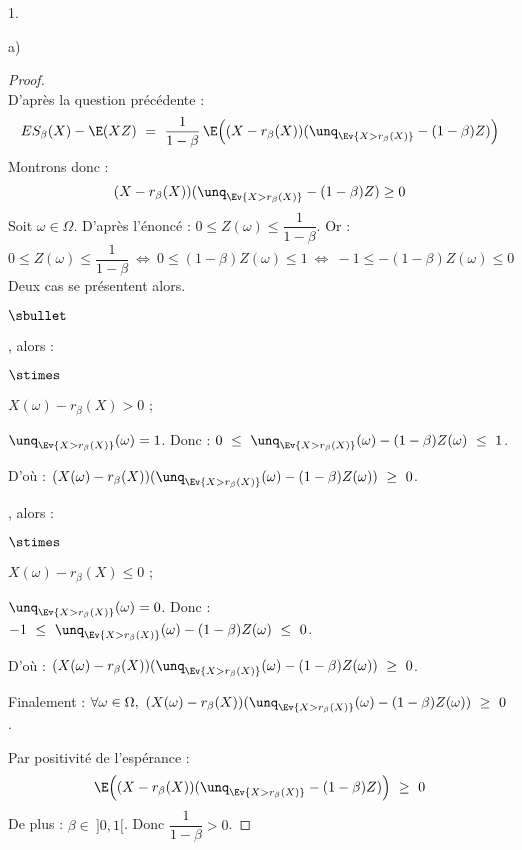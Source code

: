 \documentclass[11pt]{article}%
\begin{document}
\begin{noliste}{1.}
\begin{noliste}{a)}
    \begin{proof}~\\
      D'après la question précédente :
      \[
        ES_\beta(X) - \E(XZ) \ = \ \dfrac{1}{1-\beta} \, 
	\E\Big( (X- r_\beta(X)) (\unq_{\Ev{X > r_\beta(X)}} - 
	(1-\beta) Z )\Big)
      \]
      Montrons donc :
      \[
        (X- r_\beta(X)) (\unq_{\Ev{X > r_\beta(X)}} - 
	(1-\beta) Z ) \geq 0
      \]
      Soit $\omega \in \Omega$. D'après l'énoncé : $0 \leq Z(\omega) 
      \leq \dfrac{1}{1-\beta}$. Or :
      \[
        0 \leq Z(\omega) \leq \dfrac{1}{1-\beta} \ \Leftrightarrow \
        0 \leq (1-\beta)Z(\omega) \leq 1 \ \Leftrightarrow \ 
        -1 \leq -(1-\beta)Z(\omega) \leq 0
      \]
      Deux cas se présentent alors.
      \begin{noliste}{$\sbullet$}
	\item {}, alors :
	\begin{noliste}{$\stimes$}
	  \item $X(\omega) - r_\beta(X) > 0$ ;
	  \item $\unq_{\Ev{X >r_\beta(X)}}(\omega) =1$. Donc :
	  $0 \ \leq \ \unq_{\Ev{X > r_\beta(X)}}(\omega) - (1-\beta)Z 
	  (\omega) \ \leq \ 1$.
	\end{noliste}
	D'où : $(X(\omega) - r_\beta(X))(\unq_{\Ev{ X > r_\beta(X)}}
	(\omega) - (1-\beta) Z(\omega)) \ \geq \ 0$.
	
	\item {}, alors :
	\begin{noliste}{$\stimes$}
	  \item $X(\omega) - r_\beta(X) \leq 0$ ;
	  \item $\unq_{\Ev{X >r_\beta(X)}}(\omega) =0$. Donc :
	  $-1 \ \leq \ \unq_{\Ev{X > r_\beta(X)}}(\omega) - (1-\beta)Z 
	  (\omega) \ \leq \ 0$.
	\end{noliste}
	D'où : $(X(\omega) - r_\beta(X))(\unq_{\Ev{ X > r_\beta(X)}}
	(\omega) - (1-\beta) Z(\omega)) \ \geq \ 0$.
      \end{noliste}
      Finalement : $\forall \omega \in \Omega, \ 
      (X(\omega) - r_\beta(X))(\unq_{\Ev{ X > r_\beta(X)}}
      (\omega) - (1-\beta) Z(\omega)) \ \geq \ 0$.
      \conc{$(X - r_\beta(X))(\unq_{\Ev{ X > r_\beta(X)}}
      - (1-\beta) Z) \ \geq \ 0$}
      
      Par positivité de l'espérance :
      \[
        \E\Big( (X - r_\beta(X))(\unq_{\Ev{ X > r_\beta(X)}}
	- (1-\beta) Z) \Big) \ \geq \ 0
      \]
      De plus : $\beta \in \ ]0,1[$. Donc $\dfrac{1}{1-\beta} >0$.
      

\end{proof}
\end{noliste}
\end{noliste}
\end{document}
